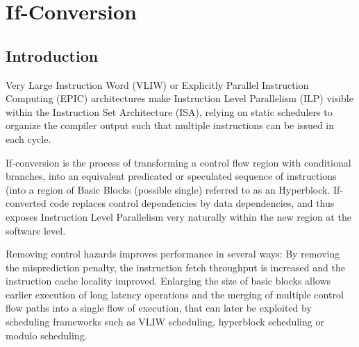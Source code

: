 \chapter{If-Conversion }\label{chapter:if_conversion}
\label{chapter:if_conversion}
\graphicspath{{img/}{if_conversion/img/}{part4/if_conversion/img/}}

\newcommand{\annotation}[1]{%
  \marginpar{\small\itshape\color{red}#1}}



\section{Introduction}

Very Large Instruction Word (VLIW) or Explicitly Parallel Instruction Computing (EPIC) architectures make Instruction Level Parallelism (ILP) visible within the Instruction Set Architecture (ISA), relying on static schedulers to organize the compiler output such that multiple instructions can be issued in each cycle.

If-conversion is the process of transforming a control flow region with conditional branches, into an equivalent predicated or speculated sequence of instructions (into a region of Basic Blocks (possible single) referred to as an Hyperblock. If-converted code replaces control dependencies by data dependencies, and thus exposes Instruction Level Parallelism very naturally within the new region at the software level.

Removing control hazards improves performance in several ways: By removing the misprediction penalty, the instruction fetch throughput is increased and the instruction cache locality improved. Enlarging the size of basic blocks allows earlier execution of long latency operations and the merging of multiple control flow paths into a single flow of execution, that can later be exploited by scheduling frameworks such as VLIW scheduling, hyperblock scheduling or modulo scheduling.

